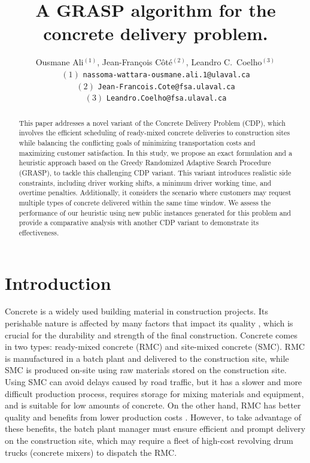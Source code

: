 \documentclass{article}
\title{A GRASP algorithm for the concrete delivery problem. }
\author{Ousmane Ali$^{(1)}$, Jean-Fran\c cois C\^ot\'e$^{(2)}$, Leandro C.~Coelho$^{(3)}$\\
 $(1)$ {\tt nassoma-wattara-ousmane.ali.1@ulaval.ca}\\
 $(2)$ {\tt Jean-Francois.Cote@fsa.ulaval.ca}\\
 $(3)$ {\tt Leandro.Coelho@fsa.ulaval.ca}\\
}
\begin{document}
\maketitle
\begin{abstract}
    This paper addresses a novel variant of the Concrete Delivery Problem (CDP), which involves the efficient scheduling of ready-mixed concrete deliveries to construction sites while balancing the conflicting goals of minimizing transportation costs and maximizing customer satisfaction. In this study, we propose an exact formulation and a heuristic approach based on the Greedy Randomized Adaptive Search Procedure (GRASP), to tackle this challenging CDP variant. This variant introduces realistic side constraints, including driver working shifts, a minimum driver working time, and overtime penalties. Additionally, it considers the scenario where customers may request multiple types of concrete delivered within the same time window. We assess the performance of our heuristic using new public instances generated for this problem and provide a comparative analysis with another CDP variant to demonstrate its effectiveness.
\end{abstract}





\section{Introduction}
\label{sec:intro}
Concrete is a widely used building material in construction projects. Its perishable nature is affected by many factors that impact its quality \citep{sinha_quality_2021}, which is crucial for the durability and strength of the final construction. Concrete comes in two types: ready-mixed concrete (RMC) and site-mixed concrete (SMC). RMC is manufactured in a batch plant and delivered to the construction site, while SMC is produced on-site using raw materials stored on the construction site. Using SMC can avoid delays caused by road traffic, but it has a slower and more difficult production process, requires storage for mixing materials and equipment, and is suitable for low amounts of concrete. On the other hand, RMC has better quality and benefits from lower production costs \citep{muresan_comparing}. However, to take advantage of these benefits, the batch plant manager must ensure efficient and prompt delivery on the construction site, which may require a fleet of high-cost revolving drum trucks (concrete mixers) to dispatch the RMC.
\end{document}
